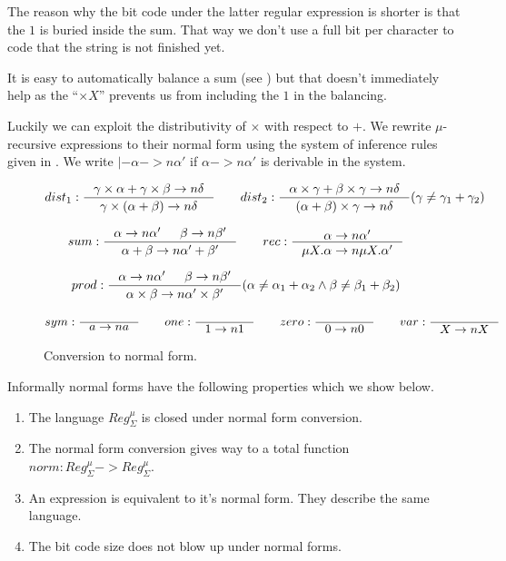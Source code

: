 \documentclass[a4paper, oneside]{memoir}
\let\fref\undefined
\theoremstyle{definition}
\begin{document}
The reason why the bit code under the latter regular expression is shorter is
that the $1$ is buried inside the sum. That way we don't use a full bit per
character to code that the string is not finished yet.

It is easy to automatically balance a sum (see \fref{chap:huffman}) but that
doesn't immediately help as the ``$\times X$'' prevents us from including the
$1$ in the balancing.

Luckily we can exploit the distributivity of $\times$ with respect to $+$. We
rewrite $\mu$-recursive expressions to their normal form using the system of
inference rules given in \fref{fig:normal-form}. We write $|- \alpha ->n
\alpha'$ if $\alpha ->n \alpha'$ is derivable in the system.

\begin{figure}
\[
dist_1 : \inference{\gamma \times \alpha + \gamma \times \beta ->n \delta}{\gamma \times
  (\alpha + \beta) ->n \delta} \qquad
dist_2 : \inference{\alpha \times \gamma + \beta \times \gamma ->n \delta}{(\alpha +
  \beta) \times \gamma ->n \delta}(\gamma \neq \gamma_1 + \gamma_2)
\]

\[
sum : \inference{\alpha ->n \alpha' & \beta ->n \beta'}{\alpha + \beta ->n \alpha' +
  \beta'} \qquad
rec : \inference{\alpha ->n \alpha'}{\mu X. \alpha ->n \mu X. \alpha'}
\]

\[
prod : \inference{\alpha ->n \alpha' & \beta ->n \beta'}{\alpha \times \beta ->n \alpha'
  \times \beta'}(\alpha \neq \alpha_1 + \alpha_2 \land \beta \neq \beta_1 + \beta_2)
\]

\[
sym : \inference{}{a ->n a} \qquad
one : \inference{}{1 ->n 1} \qquad
zero : \inference{}{0 ->n 0} \qquad
var : \inference{}{X ->n X}
\]
\caption{Conversion to normal form.}
\label{fig:normal-form}
\end{figure}

Informally normal forms have the following properties which we show below.
\begin{enumerate}
\item The language $Reg_{\Sigma}^{\mu}$ is closed under normal form conversion.
\item The normal form conversion gives way to a total function $norm :
  Reg_{\Sigma}^{\mu} -> Reg_{\Sigma}^{\mu}$.
\item An expression is equivalent to it's normal form. They describe the same
  language.
\item The bit code size does not blow up under normal forms.
\end{enumerate}
\end{document}
